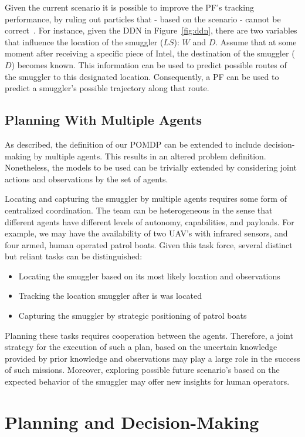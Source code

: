 \documentclass[conference]{IEEEtran}
\begin{document}
Given the current scenario it is possible to improve the PF's tracking performance, by ruling out particles that - based on the scenario - cannot be correct~\cite{Claessens2015}. For instance, given the DDN in Figure~\ref{fig:ddn}, there are two variables that influence the location of the smuggler ($LS$): $W$ and $D$. Assume that at some moment after receiving a specific piece of Intel, the destination of the smuggler ($D$) becomes known. This information can be used to predict possible routes of the smuggler to this designated location. Consequently, a PF can be used to predict a smuggler's possible trajectory along that route.

\subsection{Planning With Multiple Agents}
\label{sub:plan-mult-ag}

As described, the definition of our POMDP can be extended to include decision-making by multiple agents. This results in an altered problem definition. Nonetheless, the models to be used can be trivially extended by considering joint actions and observations by the set of agents.

Locating and capturing the smuggler by multiple agents requires some form of centralized coordination. The team can be heterogeneous in the sense that different agents have different levels of autonomy, capabilities, and payloads. For example, we may have the availability of two UAV's with infrared sensors, and four armed, human operated patrol boats. Given this task force, several distinct but reliant tasks can be distinguished:
\begin{itemize}
\item Locating the smuggler based on its most likely location and observations
\item Tracking the location smuggler after is was located
\item Capturing the smuggler by strategic positioning of patrol boats
\end{itemize}
Planning these tasks requires cooperation between the agents. Therefore, a joint strategy for the execution of such a plan, based on the uncertain knowledge provided by prior knowledge and observations may play a large role in the success of such missions. Moreover, exploring possible future scenario's based on the expected behavior of the smuggler may offer new insights for human operators.

\section{Planning and Decision-Making}
\label{sec:ma-dec-mak}
\end{document}
